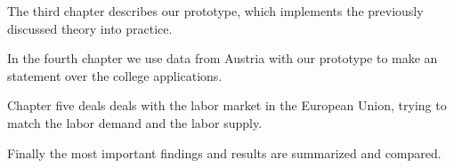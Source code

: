 The third chapter describes our prototype, which implements the previously discussed theory into practice.

In the fourth chapter we use data from Austria with our prototype to make an statement over the college applications.

Chapter five deals deals with the labor market in the European Union, trying to match the labor demand and the labor supply.

Finally the most important findings and results are summarized and compared.

